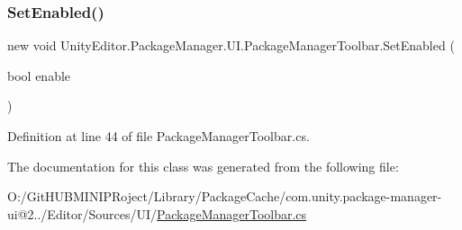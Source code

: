 \subsubsection{\texorpdfstring{SetEnabled()}{SetEnabled()}}
{\footnotesize\ttfamily new void Unity\+Editor.\+Package\+Manager.\+U\+I.\+Package\+Manager\+Toolbar.\+Set\+Enabled (\begin{DoxyParamCaption}\item[{bool}]{enable }\end{DoxyParamCaption})}



Definition at line 44 of file Package\+Manager\+Toolbar.\+cs.



The documentation for this class was generated from the following file\+:\begin{DoxyCompactItemize}
\item 
O\+:/\+Git\+H\+U\+B\+M\+I\+N\+I\+P\+Roject/\+Library/\+Package\+Cache/com.\+unity.\+package-\/manager-\/ui@2../\+Editor/\+Sources/\+U\+I/\mbox{\hyperlink{_package_manager_toolbar_8cs}{Package\+Manager\+Toolbar.\+cs}}\end{DoxyCompactItemize}
